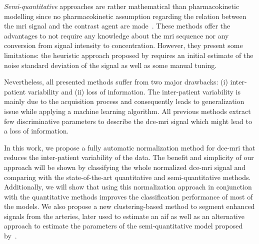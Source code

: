 \emph{Semi-quantitative} approaches are rather mathematical than pharmacokinetic modelling since no pharmacokinetic assumption regarding the relation between the \ac{mri} signal and the contrast agent are made~\citep{huisman2001accurate,gliozzi2011phenomenological}.
These methods offer the advantages to not require any knowledge about the \ac{mri} sequence nor any conversion from signal intensity to concentration.
However, they present some limitations: the heuristic approach proposed by \citeauthor{huisman2001accurate} requires an initial estimate of the noise standard deviation of the signal as well as some manual tuning.

Nevertheless, all presented methods suffer from two major drawbacks:
(i) inter-patient variability and (ii) loss of information.
The inter-patient variability is mainly due to the acquisition process and consequently leads to generalization issue while applying a machine learning algorithm.
All previous methods extract few discriminative parameters to describe the \ac{dce}-\ac{mri} signal which might lead to a loss of information.

In this work, we propose a fully automatic normalization method for \ac{dce}-\ac{mri} that reduces the inter-patient variability of the data.
The benefit and simplicity of our approach will be shown by classifying the whole normalized \ac{dce}-\ac{mri} signal and comparing with the state-of-the-art quantitative and semi-quantitative methods.
Additionally, we will show that using this normalization approach in conjunction with the quantitative methods improves the classification performance of most of the models.
We also propose a new clustering-based method to segment enhanced signals from the arteries, later used to estimate an \ac{aif} as well as an alternative approach to estimate the parameters of the semi-quantitative model proposed by~\cite{huisman2001accurate}.


